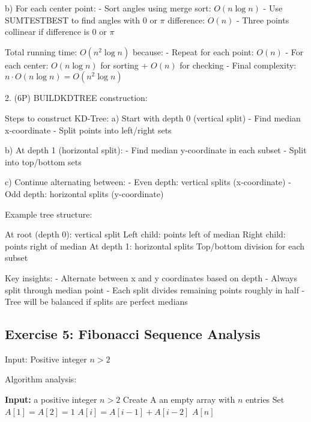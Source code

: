 b) For each center point:
   - Sort angles using merge sort: $O(n \log n)$
   - Use SUMTESTBEST to find angles with 0 or $\pi$ difference: $O(n)$
   - Three points collinear if difference is 0 or $\pi$

Total running time: $O(n^2 \log n)$ because:
- Repeat for each point: $O(n)$
- For each center: $O(n \log n)$ for sorting + $O(n)$ for checking
- Final complexity: $n \cdot O(n \log n) = O(n^2 \log n)$

2. (6P) BUILDKDTREE construction:

Steps to construct KD-Tree:
a) Start with depth 0 (vertical split)
   - Find median x-coordinate
   - Split points into left/right sets

b) At depth 1 (horizontal split):
   - Find median y-coordinate in each subset
   - Split into top/bottom sets

c) Continue alternating between:
   - Even depth: vertical splits (x-coordinate)
   - Odd depth: horizontal splits (y-coordinate)

Example tree structure:
\begin{algorithm}
\begin{algorithmic}[1]
\State At root (depth 0): vertical split
\State \quad Left child: points left of median
\State \quad Right child: points right of median
\State At depth 1: horizontal splits
\State \quad Top/bottom division for each subset
\end{algorithmic}
\end{algorithm}

Key insights:
- Alternate between x and y coordinates based on depth
- Always split through median point
- Each split divides remaining points roughly in half
- Tree will be balanced if splits are perfect medians

\subsection{Exercise 5: Fibonacci Sequence Analysis}

Input: Positive integer $n > 2$

Algorithm analysis:
\begin{algorithm}
\begin{algorithmic}[1]
\State \textbf{Input:} a positive integer $n > 2$
\State Create A an empty array with $n$ entries
\State Set $A[1] = A[2] = 1$
    \State $A[i] = A[i-1] + A[i-2]$
\EndFor
\State \Return $A[n]$
\end{algorithmic}
\end{algorithm}

